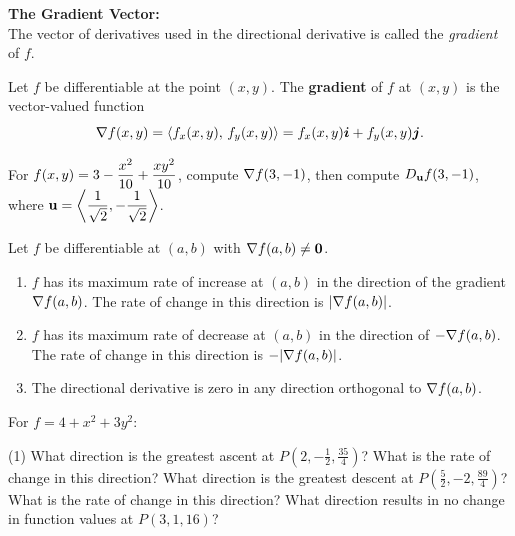 \documentclass[mathNotesPreamble]{subfiles}
\begin{document}
  \noindent
  \textbf{The Gradient Vector:}\\
  The vector of derivatives used in the directional derivative is called the \textit{gradient} of $f$.
  \begin{defn*}
    Let $f$ be differentiable at the point $(x,y)$. The \textbf{gradient} of $f$ at $(x,y)$ is the vector-valued function
      \[\nabla f(x,y)={\left\langle f_x(x,y),\,f_y(x,y) \right\rangle}=f_x(x,y){\bm{i}}+f_y(x,y){\bm{j}}.\]
  \end{defn*}

  \begin{ex*}
    For $\displaystyle f(x,y)=3-\frac{x^2}{10}+\frac{xy^2}{10}$, compute $\nabla f(3,-1)$, then compute $D_{\mathbf{u}} f(3,-1)$, where $\displaystyle{\mathbf{u}}={\left\langle \frac{1}{\sqrt{2}},-\frac{1}{\sqrt{2}} \right\rangle}$.
  \end{ex*}

  \begin{thmBox*}
    Let $f$ be differentiable at $(a,b)$ with $\nabla f(a,b)\neq \mathbf{0}$.
    \begin{enumerate}
      \item 
        $f$ has its maximum rate of increase at $(a,b)$ in the direction of the gradient $\nabla f(a,b)$. The rate of change in this direction is ${\left\vert\nabla f(a,b)\right\vert}$.
      \item 
        $f$ has its maximum rate of decrease at $(a,b)$ in the direction of $-\nabla f(a,b)$. The rate of change in this direction is $-{\left\vert\nabla f(a,b)\right\vert}$.
      \item 
        The directional derivative is zero in any direction orthogonal to $\nabla f(a,b)$.
    \end{enumerate}
  \end{thmBox*}
  \pagebreak

  \begin{ex*}
    For $f=4+x^2+3y^2$: 
  \end{ex*}
  \begin{tasks}[after-item-skip=\stretch{1}, label=](1)
    \task What direction is the greatest ascent at $P(2,-\frac{1}{2}, \frac{35}{4})$? What is the rate of change in this direction?
    \task What direction is the greatest descent at $P(\frac{5}{2},-2, \frac{89}{4})$? What is the rate of  change in this direction?
    \task What direction results in no change in function values at $P(3,1, 16)$?
  \end{tasks}
  \pagebreak
\end{document}
